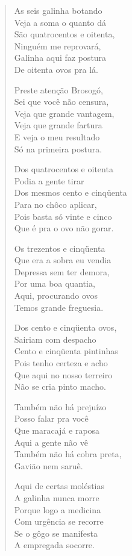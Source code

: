 \begin{verse}
As seis galinha botando\\
Veja a soma o quanto dá\\
São quatrocentos e oitenta,\\
Ninguém me reprovará,\\
Galinha aqui faz postura\\
De oitenta ovos pra lá.

Preste atenção Brosogó,\\
Sei que você não censura,\\
Veja que grande vantagem,\\
Veja que grande fartura\\
E veja o meu resultado\\
Só na primeira postura.

Dos quatrocentos e oitenta\\
Podia a gente tirar\\
Dos mesmos cento e cinqüenta\\
Para no chôco aplicar,\\
Pois basta só vinte e cinco\\
Que é pra o ovo não gorar.

Os trezentos e cinqüenta\\
Que era a sobra eu vendia\\
Depressa sem ter demora,\\
Por uma boa quantia,\\
Aqui, procurando ovos\\
Temos grande freguesia.

Dos cento e cinqüenta ovos,\\
Sairiam com despacho\\
Cento e cinqüenta pintinhas\\
Pois tenho certeza e acho\\
Que aqui no nosso terreiro\\
Não se cria pinto macho.

Também não há prejuízo\\
Posso falar pra você\\
Que maracajá e raposa\\
Aqui a gente não vê\\
Também não há cobra preta,\\
Gavião nem saruê.

Aqui de certas moléstias\\
A galinha nunca morre\\
Porque logo a medicina\\
Com urgência se recorre\\
Se o gôgo se manifesta\\
A empregada socorre.


\end{verse}

